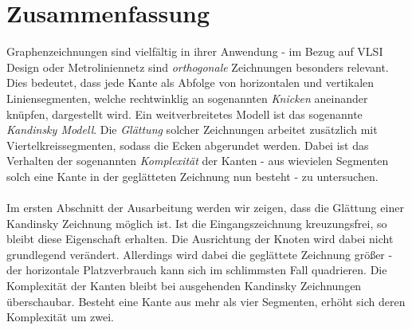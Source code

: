 \section*{Zusammenfassung}
Graphenzeichnungen sind vielfältig in ihrer Anwendung - im Bezug auf VLSI Design oder Metroliniennetz sind \textit{orthogonale} Zeichnungen besonders relevant. Dies bedeutet, dass jede Kante als Abfolge von horizontalen und vertikalen Liniensegmenten, welche rechtwinklig an sogenannten \textit{Knicken} aneinander knüpfen, dargestellt wird. Ein weitverbreitetes Modell ist das sogenannte \textit{Kandinsky Modell}. Die \textit{Glättung} solcher Zeichnungen arbeitet zusätzlich mit Viertelkreissegmenten, sodass die Ecken abgerundet werden. Dabei ist das Verhalten der sogenannten \textit{Komplexität} der Kanten - aus wievielen Segmenten solch eine Kante in der geglätteten Zeichnung nun besteht - zu untersuchen.
\\\\
Im ersten Abschnitt der Ausarbeitung werden wir zeigen, dass die Glättung einer Kandinsky Zeichnung möglich ist. Ist die Eingangszeichnung kreuzungsfrei, so bleibt diese Eigenschaft erhalten. Die Ausrichtung der Knoten wird dabei nicht grundlegend verändert. Allerdings wird dabei die geglättete Zeichnung größer - der horizontale Platzverbrauch kann sich im schlimmsten Fall quadrieren. Die Komplexität der Kanten bleibt bei ausgehenden Kandinsky Zeichnungen überschaubar. Besteht eine Kante aus mehr als vier Segmenten, erhöht sich deren Komplexität um zwei. 
\\\\
